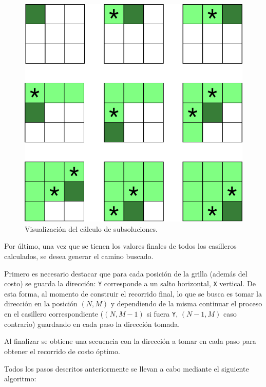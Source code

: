 	\begin{figure}[H]
		\centering
		\includegraphics{imagenes/ej3_grilla_2.pdf}
		\caption{Visualización del cálculo de subsoluciones.}
	\end{figure}

	Por último, una vez que se tienen los valores finales de todos los
	casilleros calculados, se desea generar el camino buscado.

	Primero es necesario destacar que para cada posición de la
	grilla (además del costo) se guarda la dirección: \texttt{Y} corresponde a
	un salto horizontal, \texttt{X} vertical. De esta forma, al momento de
	construir el recorrido final, lo que se busca es tomar la dirección en la
	posición $(N, M)$ y dependiendo de la misma continuar el proceso
	en el casillero correspondiente ($(N, M - 1)$ si fuera \texttt{Y}, $(N - 1,
	M)$ caso contrario) guardando en cada paso la dirección tomada.

	Al finalizar se obtiene una secuencia con la dirección a tomar
	en cada paso para obtener el recorrido de costo óptimo.

	Todos los pasos descritos anteriormente se llevan a cabo mediante el siguiente algoritmo:

